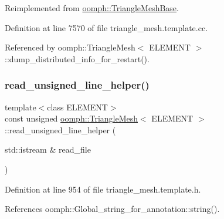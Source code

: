 Reimplemented from \hyperlink{classoomph_1_1TriangleMeshBase_a56273b6d7b690d37f07632c7028adcf8}{oomph\+::\+Triangle\+Mesh\+Base}.



Definition at line 7570 of file triangle\+\_\+mesh.\+template.\+cc.



Referenced by oomph\+::\+Triangle\+Mesh$<$ E\+L\+E\+M\+E\+N\+T $>$\+::dump\+\_\+distributed\+\_\+info\+\_\+for\+\_\+restart().

\mbox{\label{classoomph_1_1TriangleMesh_a64a1a162d84647e1821813f245b96734}} 
\subsubsection{\texorpdfstring{read\+\_\+unsigned\+\_\+line\+\_\+helper()}{read\_unsigned\_line\_helper()}}
{\footnotesize\ttfamily template$<$class E\+L\+E\+M\+E\+NT$>$ \\
const unsigned \hyperlink{classoomph_1_1TriangleMesh}{oomph\+::\+Triangle\+Mesh}$<$ E\+L\+E\+M\+E\+NT $>$\+::read\+\_\+unsigned\+\_\+line\+\_\+helper (\begin{DoxyParamCaption}\item[{std\+::istream \&}]{read\+\_\+file }\end{DoxyParamCaption})\hspace{0.3cm}{\ttfamily [inline]}}



Definition at line 954 of file triangle\+\_\+mesh.\+template.\+h.



References oomph\+::\+Global\+\_\+string\+\_\+for\+\_\+annotation\+::string().

\mbox{\label{classoomph_1_1TriangleMesh_aa4b1cfd4537c1e511fe1f2fb14b1e8a6}} 

